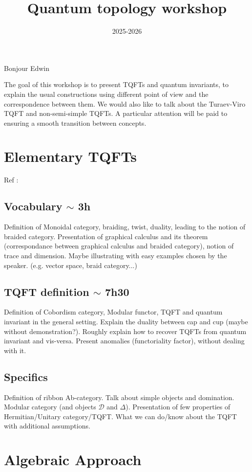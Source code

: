 \documentclass{article}
\title{Quantum topology workshop}
\date{2025-2026}
\begin{document}
\maketitle

Bonjour  Edwin

The goal of this workshop is to present TQFTs and quantum invariants, to explain the usual constructions using different point of view and the correspondence between them. We would also like to talk about the Turaev-Viro TQFT and non-semi-simple TQFTs. A particular attention will be paid to ensuring a smooth transition between concepts.

\section{Elementary TQFTs} Ref : \cite{Tur}
\subsection{Vocabulary $\sim$ 3h} Definition of Monoidal category, braiding, twist, duality, leading to the notion of braided category. Presentation of graphical calculus and its theorem (correspondance between graphical calculus and braided category), notion of trace and dimension. Maybe illustrating with easy examples chosen by the speaker. (e.g. vector space, braid category...)

\subsection{TQFT definition $\sim$ 7h30} Definition of Cobordism category, Modular functor, TQFT and quantum invariant in the general setting. Explain the duality between cap and cup (maybe without demonstration?). Roughly explain how to recover TQFTs from quantum invariant and vis-versa. Present anomalies (functoriality factor), without dealing with it.

\subsection{Specifics} Definition of ribbon Ab-category. Talk about simple objects and domination. Modular category (and objects $\mathcal{D}$ and $\Delta$). Presentation of few properties of Hermitian/Unitary category/TQFT. What we can do/know about the TQFT with additional assumptions.

\section{Algebraic Approach} 
\end{document}
